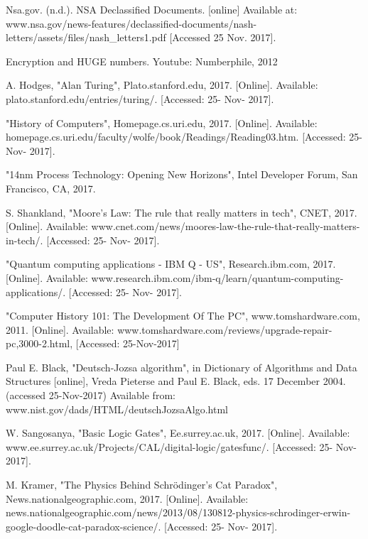 \documentclass[10pt,journal,compsoc]{IEEEtran}
\begin{document}
%
%
%

\begin{thebibliography}{1}
	
	Nsa.gov. (n.d.). NSA Declassified Documents. [online] Available at: www.nsa.gov/news-features/declassified-documents/nash-letters/assets/files/nash\_letters1.pdf [Accessed 25 Nov. 2017].
	
	Encryption and HUGE numbers. Youtube: Numberphile, 2012
	
	A. Hodges, "Alan Turing", Plato.stanford.edu, 2017. [Online]. Available: plato.stanford.edu/entries/turing/. [Accessed: 25- Nov- 2017].
	
	
	"History of Computers", Homepage.cs.uri.edu, 2017. [Online]. Available: homepage.cs.uri.edu/faculty/wolfe/book/Readings/Reading03.htm. [Accessed: 25- Nov- 2017].
	
	"14nm Process Technology: Opening New Horizons", Intel Developer Forum, San Francisco, CA, 2017.
	
	S. Shankland, "Moore's Law: The rule that really matters in tech", CNET, 2017. [Online]. Available: www.cnet.com/news/moores-law-the-rule-that-really-matters-in-tech/. [Accessed: 25- Nov- 2017].
	
	"Quantum computing applications - IBM Q - US", Research.ibm.com, 2017. [Online]. Available: www.research.ibm.com/ibm-q/learn/quantum-computing-applications/. [Accessed: 25- Nov- 2017].
	
	"Computer History 101: The Development Of The PC", www.tomshardware.com, 2011. [Online]. Available: www.tomshardware.com/reviews/upgrade-repair-pc,3000-2.html, [Accessed: 25-Nov-2017]
	
	Paul E. Black, "Deutsch-Jozsa algorithm", in Dictionary of Algorithms and Data Structures [online], Vreda Pieterse and Paul E. Black, eds. 17 December 2004. (accessed 25-Nov-2017) Available from: www.nist.gov/dads/HTML/deutschJozsaAlgo.html
	
	W. Sangosanya, "Basic Logic Gates", Ee.surrey.ac.uk, 2017. [Online]. Available: www.ee.surrey.ac.uk/Projects/CAL/digital-logic/gatesfunc/. [Accessed: 25- Nov- 2017].
	
	M. Kramer, "The Physics Behind Schrödinger's Cat Paradox", News.nationalgeographic.com, 2017. [Online]. Available: news.nationalgeographic.com/news/2013/08/130812-physics-schrodinger-erwin-google-doodle-cat-paradox-science/. [Accessed: 25- Nov- 2017].
	
\end{thebibliography}




\end{document}
